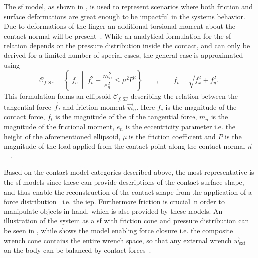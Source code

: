 The \gls{sf} model, as shown in , is used to represent scenarios where both friction and surface deformations are great enough to be impactful in the systems behavior. Due to deformations of the finger an additional torsional moment about the contact normal will be present~\cite[Chapter 38]{handbook-of-robotics}. While an analytical formulation for the \gls{sf} relation depends on the pressure distribution inside the contact, and
can only be derived for a limited number of special cases, the general case is approximated using 
%
\begin{equation} 
	\mathcal{C}_{f,\text{SF}} = \left\{ \; f_c \; \middle| \; f_t^2 + \frac{m_n^2}{e_n^2} \le \mu^2 P^2 \right\} \qquad , \qquad f_t = \sqrt{f_x^2 + f_y^2}.
	\label{eq:sf}
\end{equation}
This formulation forms an ellipsoid $\mathcal{C}_{f,\text{SF}}$ describing the relation between the tangential force $\vec{f}_t$ and friction moment $\vec{m}_n$. Here $f_c$ is the magnitude of the contact force, $f_t$ is the magnitude of the of the tangential force, $m_n$ is the magnitude of the frictional moment, $e_n$ is the eccentricity parameter i.e. the height of the aforementioned ellipsoid, $\mu$ is the friction coefficient and $P$ is the magnitude of the load applied from the contact point along the contact normal $\vec{n}$~\cite{practical-force-motion-models-for-sliding-manipulation}~\cite{soft-finger-model-with-adaptive-contact-geometry-for-grasping-and-manipulation-tasks}. \medskip

Based on the contact model categories described above, the most representative is the \gls{sf} models since these can provide descriptions of the contact surface shape, and thus enable the reconstruction of the contact shape from the application of a force distribution~\cite{contact-mechanics} i.e. the \gls{iep}. Furthermore friction is crucial in order to manipulate objects in-hand, which is also provided by these models. An illustration of the system as a \gls{sf} with friction cone and pressure distribution can be seen in , while  shows the model enabling force closure i.e. the composite wrench cone contains the entire wrench space, so that any external wrench $\vec{w}_{\text{ext}}$ on the body can be balanced by contact forces~\cite{modern-robotics-mechanics-planning-and-control}.

